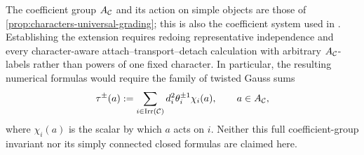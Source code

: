 The coefficient group $A_{\mathcal{C}}$ and its action on simple objects are those
of \cref{prop:characters-universal-grading}; this is also the coefficient
system used in \cite[Definitions~1 and~9]{Yetter1993}.  Establishing the
extension requires redoing representative independence and every
character-aware attach--transport--detach calculation with arbitrary
$A_{\mathcal{C}}$-labels rather than powers of one fixed character.  In particular,
the resulting numerical formulas would require the family of twisted Gauss
sums
\[
  \tau^{\pm}(a)
  :=\sum_{i\in\operatorname{Irr}(\mathcal{C})}
       d_i^2\theta_i^{\pm1}\chi_i(a),
  \qquad a\in A_{\mathcal{C}},
\]
where $\chi_i(a)$ is the scalar by which $a$ acts on $i$.  Neither this full
coefficient-group invariant nor its simply connected closed formulas are
claimed here.
